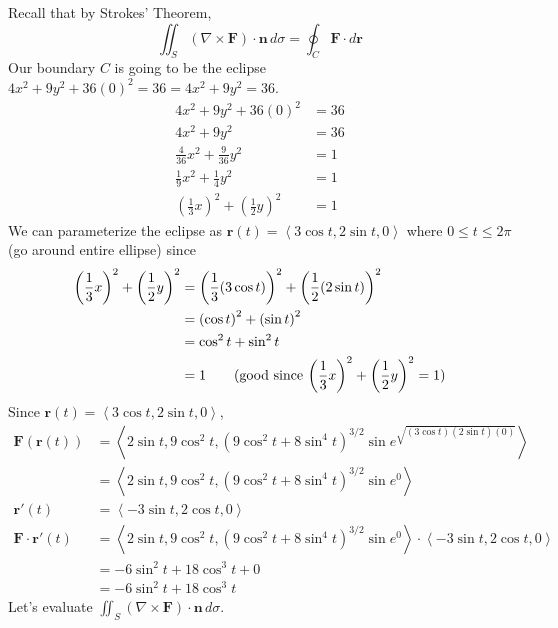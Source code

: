 \documentclass{article}
\newcommand{\lrp}[1]{\left( #1 \right)}
\newcommand{\lra}[1]{\left\langle #1 \right\rangle}
\renewcommand{\r}[0]{\mathbf{r}}
\newcommand{\F}[0]{\mathbf{F}}
\newcommand{\n}[0]{\mathbf{n}}
\begin{document}
Recall that by Strokes' Theorem,
\begin{equation*}
    \iint_S \lrp{\nabla \times \F}\cdot \n\,d\sigma = \oint_C \F\cdot d\r
\end{equation*}
Our boundary $C$ is going to be the eclipse  $4x^2+9y^2+36(0)^2=36=4x^2+9y^2=36$.  
\begin{align*}
    4x^2+9y^2+36(0)^2&=36\\
    4x^2+9y^2 &= 36\\
    \frac{4}{36}x^2+\frac{9}{36}y^2&=1\\
    \frac{1}{9}x^2+\frac{1}{4}y^2&=1\\
    \lrp{\frac{1}{3}x}^2 + \lrp{\frac{1}{2}y}^2&=1
\end{align*}
We can parameterize the eclipse as $\r(t)=\lra{3\cos t, 2\sin t, 0}$ where $0\leq t \leq 2\pi$ (go around entire ellipse) since
\begin{align*}
    \lrp{\frac{1}{3}x}^2 + \lrp{\frac{1}{2}y}^2&=
    \bigg(\frac{1}{3}(3\cos t)\bigg)^2+\bigg(\frac{1}{2}(2\sin t)\bigg)^2\\
    &=\lrp{\cos t}^2+\lrp{\sin t}^2\\
    &=\cos^2 t+ \sin ^2 t \\
    &=1\tag{good since $\displaystyle \lrp{\frac{1}{3}x}^2 + \lrp{\frac{1}{2}y}^2=1$}
\end{align*}
Since $\r(t)=\lra{3\cos t, 2\sin t, 0}$,
\begin{align*}
    \F\lrp{\r(t)}&=\lra{2\sin t, 9\cos^2 t, \lrp{9\cos ^2 t + 8\sin^4 t}^{3/2}\sin e^{\sqrt{(3\cos t)(2\sin t)(0)}}}\\
    &=\lra{2\sin t,9\cos^2 t, \lrp{9\cos ^2 t+8\sin^4 t}^{3/2}\sin e^0}\\
    \r'(t)&=\lra{-3\sin t, 2\cos t,0}\\
    \F\cdot \r'(t)&=\lra{2\sin t,9\cos^2 t, \lrp{9\cos ^2 t+8\sin^4 t}^{3/2}\sin e^0}\cdot \lra{-3\sin t, 2\cos t, 0}\\
    &=-6\sin ^2 t+ 18\cos ^3 t + 0\\
    &=-6\sin^2 t + 18\cos^3 t
\end{align*}
Let's evaluate $\displaystyle \iint_S \lrp{\nabla \times \F}\cdot \n\,d\sigma$.
\end{document}
